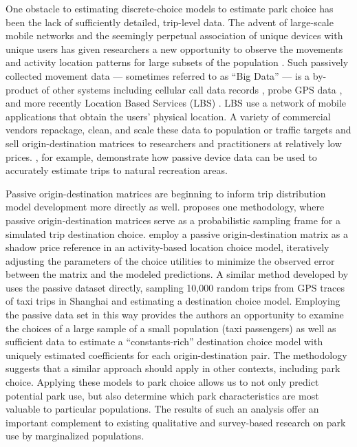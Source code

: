 \documentclass[]{elsarticle} %
\begin{document}
One obstacle to estimating discrete-choice models to estimate park choice has
been the lack of sufficiently detailed, trip-level data. The advent of
large-scale mobile networks and the seemingly perpetual association of unique
devices with unique users has given researchers a new opportunity to observe the
movements and activity location patterns for large subsets of the population
\citep{Naboulsi2016}. Such passively collected movement data --- sometimes referred
to as ``Big Data'' --- is a by-product of other systems including cellular call
data records \citep[e.g.,][]{Bolla2000, Calabrese2011}, probe GPS data \citep{Huang2015},
and more recently Location Based Services (LBS) \citep{Roll2019, Komanduri2017}. LBS
use a network of mobile applications that obtain the users' physical location. A
variety of commercial vendors repackage, clean, and scale these data to
population or traffic targets and sell origin-destination matrices to
researchers and practitioners at relatively low prices. \citet{Monz2019}, for example,
demonstrate how passive device data can be used to accurately estimate trips to
natural
recreation areas.

Passive origin-destination matrices are beginning to inform trip distribution
model development more directly as well. \citet{tf_idea} proposes one methodology,
where passive origin-destination matrices serve as a probabilistic sampling
frame for a simulated trip destination choice. \citet{Bernardin2018} employ a passive
origin-destination matrix as a shadow price reference in an activity-based
location choice model, iteratively adjusting the parameters of the choice
utilities to minimize the observed error between the matrix and the modeled
predictions. A similar method developed by \citet{Zhu2018} uses the passive dataset
directly, sampling 10,000 random trips from GPS traces of taxi trips in Shanghai
and estimating a destination choice model. Employing the passive data set in
this way provides the authors an opportunity to examine the choices of a large
sample of a small population (taxi passengers) as well as sufficient data to
estimate a ``constants-rich'' destination choice model with uniquely estimated
coefficients for each origin-destination pair. The \citet{Zhu2018} methodology suggests
that a similar approach should apply in other contexts, including park choice.
Applying these models to park choice allows us to not only predict potential
park use, but also determine which park characteristics are most valuable to
particular populations. The results of such an analysis offer an important
complement to existing qualitative and survey-based research on park use by
marginalized populations.
\end{document}
